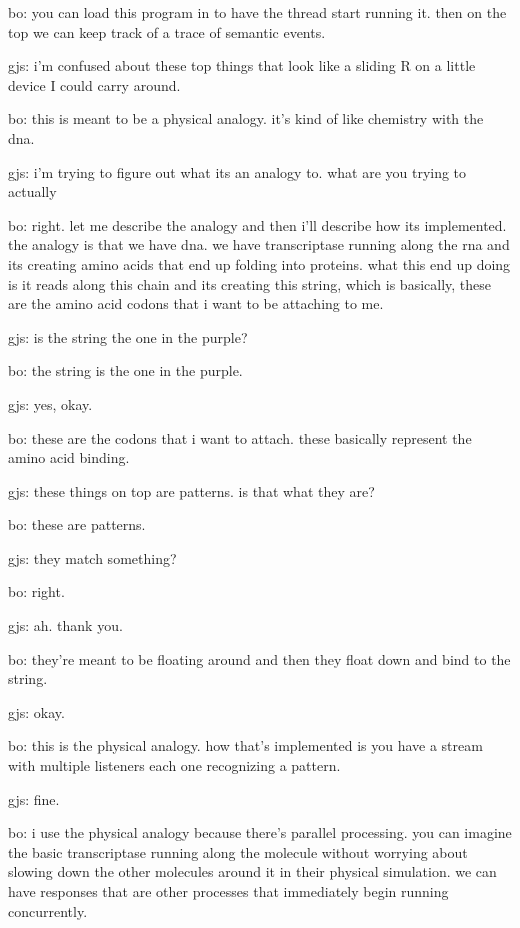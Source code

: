 bo: you can load this program in to have the thread start running it.
then on the top we can keep track of a trace of semantic events.

gjs: i'm confused about these top things that look like a sliding R on a little device I could carry around.

bo: this is meant to be a physical analogy.
it's kind of like chemistry with the dna.

gjs: i'm trying to figure out what its an analogy to.
what are you trying to actually

bo: right.  let me describe the analogy and then i'll describe how its implemented.
the analogy is that we have dna.
we have transcriptase running along the rna
and its creating amino acids that end up folding into proteins.
what this end up doing is it reads along this chain and its creating this string, which is basically, these are the amino acid codons that i want to be attaching to me.

gjs: is the string the one in the purple?

bo: the string is the one in the purple.

gjs: yes, okay.

bo: these are the codons that i want to attach.
these basically represent the amino acid binding.

gjs: these things on top are patterns.
is that what they are?

bo: these are patterns.

gjs: they match something?

bo: right.

gjs: ah.  thank you.

bo: they're meant to be floating around and then they float down and bind to the string.

gjs: okay.

bo: this is the physical analogy.
how that's implemented is you have a stream with multiple listeners each one recognizing a pattern.

gjs: fine.

bo: i use the physical analogy because there's parallel processing.
you can imagine the basic transcriptase running along the molecule without worrying about slowing down the other molecules around it in their physical simulation.
we can have responses that are other processes that immediately begin running concurrently.















